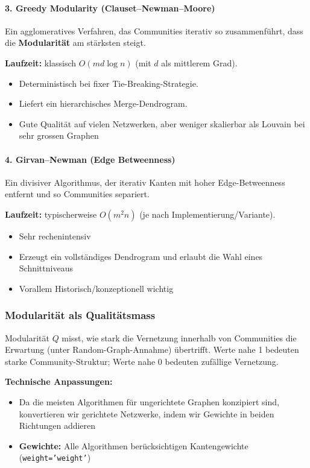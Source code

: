 \paragraph{3. Greedy Modularity (Clauset--Newman--Moore)}
Ein agglomeratives Verfahren, das Communities iterativ so zusammenführt, dass die \textbf{Modularität} am stärksten steigt.

\textbf{Laufzeit:} klassisch $O(md \log n)$ (mit $d$ als mittlerem Grad).

\begin{itemize}
  \item Deterministisch bei fixer Tie-Breaking-Strategie.
  \item Liefert ein hierarchisches Merge-Dendrogram.
  \item Gute Qualität auf vielen Netzwerken, aber weniger skalierbar als Louvain bei sehr grossen Graphen
\end{itemize}

\paragraph{4. Girvan--Newman (Edge Betweenness)}
Ein divisiver Algorithmus, der iterativ Kanten mit hoher Edge-Betweenness entfernt und so Communities separiert.

\textbf{Laufzeit:} typischerweise $O(m^2 n)$ (je nach Implementierung/Variante).


\begin{itemize}
  \item Sehr rechenintensiv
  \item Erzeugt ein vollständiges Dendrogram und erlaubt die Wahl eines Schnittniveaus
  \item Vorallem Historisch/konzeptionell wichtig
\end{itemize}

\subsubsection{Modularität als Qualitätsmass}

Modularität $Q$ misst, wie stark die Vernetzung innerhalb von Communities die Erwartung (unter Random-Graph-Annahme) übertrifft. Werte nahe 1 bedeuten starke Community-Struktur; Werte nahe 0 bedeuten zufällige Vernetzung.

\textbf{Technische Anpassungen:}
\begin{itemize}
  \item Da die meisten Algorithmen für ungerichtete Graphen konzipiert sind, konvertieren wir gerichtete Netzwerke, indem wir Gewichte in beiden Richtungen addieren
  \item \textbf{Gewichte:} Alle Algorithmen berücksichtigen Kantengewichte (\texttt{weight='weight'})
\end{itemize}

